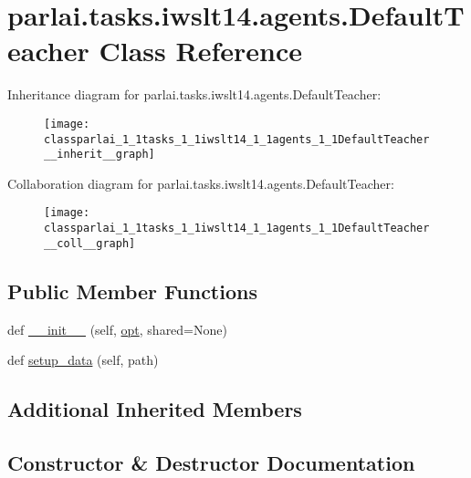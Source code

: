 \hypertarget{classparlai_1_1tasks_1_1iwslt14_1_1agents_1_1DefaultTeacher}{}\section{parlai.\+tasks.\+iwslt14.\+agents.\+Default\+Teacher Class Reference}
\label{classparlai_1_1tasks_1_1iwslt14_1_1agents_1_1DefaultTeacher}


Inheritance diagram for parlai.\+tasks.\+iwslt14.\+agents.\+Default\+Teacher\+:
\nopagebreak
\begin{figure}[H]
\begin{center}
\leavevmode
\texttt{[image: classparlai\_1\_1tasks\_1\_1iwslt14\_1\_1agents\_1\_1DefaultTeacher\_\_inherit\_\_graph]}
\end{center}
\end{figure}


Collaboration diagram for parlai.\+tasks.\+iwslt14.\+agents.\+Default\+Teacher\+:
\nopagebreak
\begin{figure}[H]
\begin{center}
\leavevmode
\texttt{[image: classparlai\_1\_1tasks\_1\_1iwslt14\_1\_1agents\_1\_1DefaultTeacher\_\_coll\_\_graph]}
\end{center}
\end{figure}
\subsection*{Public Member Functions}
\begin{DoxyCompactItemize}
\item 
def \hyperlink{classparlai_1_1tasks_1_1iwslt14_1_1agents_1_1DefaultTeacher_a7a9bec3db40cf2d087952493dbbae0a0}{\+\_\+\+\_\+init\+\_\+\+\_\+} (self, \hyperlink{classparlai_1_1core_1_1agents_1_1Teacher_a3ce6243860ce978a897922863ed32fa4}{opt}, shared=None)
\item 
def \hyperlink{classparlai_1_1tasks_1_1iwslt14_1_1agents_1_1DefaultTeacher_a3294d31a37e9260469383275154df900}{setup\+\_\+data} (self, path)
\end{DoxyCompactItemize}
\subsection*{Additional Inherited Members}


\subsection{Constructor \& Destructor Documentation}
\mbox{\label{classparlai_1_1tasks_1_1iwslt14_1_1agents_1_1DefaultTeacher_a7a9bec3db40cf2d087952493dbbae0a0}} 
